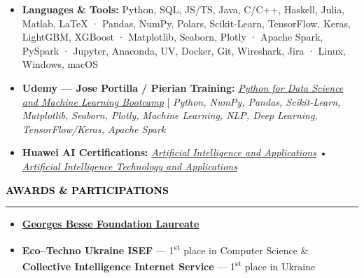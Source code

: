 \documentclass[10pt,english,french]{article}
\newcommand{\awardIcon}[1][black]{\textcolor{#1}{\faTrophy}}
\newcommand{\cvsection}[1]{
    \vspace{4pt}
    \textbf{\fontsize{9pt}{10pt}\selectfont \textcolor{black}{#1}}
    \vspace{6pt}
    \hrule
    \vspace{6pt}
}
\begin{document}
\vspace{-4pt}
\begin{itemize}[leftmargin=0.5cm, label=\textbullet, itemsep=0.2em]
    \item \textbf{Languages \& Tools\!:}
          Python, SQL, JS/TS, Java, C/C++, Haskell, Julia, Matlab, LaTeX ·
          Pandas, NumPy, Polars, Scikit-Learn, TensorFlow, Keras, LightGBM, XGBoost ·
          Matplotlib, Seaborn, Plotly ·
          Apache Spark, PySpark ·
          Jupyter, Anaconda, UV, Docker, Git, Wireshark, Jira ·
          Linux, Windows, macOS

    \item \textbf{Udemy --- Jose Portilla / Pierian Training\!:}
          \href{https://www.udemy.com/certificate/UC-51319000-ccb8-4c9c-9320-6cd9860e601c/}
          {\textit{Python for Data Science and Machine Learning Bootcamp}}
          |
          \textit{Python, NumPy, Pandas, Scikit-Learn, Matplotlib, Seaborn, Plotly,
              Machine Learning, NLP, Deep Learning, TensorFlow/Keras, Apache Spark}

    \item \textbf{Huawei AI Certifications:}
          \href{https://github.com/DmytroPalahin/cv-latex-simple-en/blob/main/docs/huawei_artificial_intelligence_and_applications.pdf}
          {\textit{Artificial Intelligence and Applications}}
          \hspace{4pt}•\hspace{4pt}
          \href{https://github.com/DmytroPalahin/cv-latex-simple-en/blob/main/docs/huawei_artificial_intelligence_technology_and_applications.pdf}
          {\textit{Artificial Intelligence Technology and Applications}}

\end{itemize}

\vspace{-3pt}
\cvsection{\awardIcon[black]\hspace{4pt}AWARDS \& PARTICIPATIONS}

\vspace{-6pt}
\begin{itemize}[leftmargin=0.35cm, label=\textbullet, itemsep=0.15em]
    \item \textbf{\href{https://www.fondationbesse.com/}{Georges Besse Foundation Laureate}}
    \item \textbf{Eco\hspace{3pt}--\hspace{3pt}Techno Ukraine ISEF} --- 1\textsuperscript{st} place in Computer Science \& \textbf{Collective Intelligence Internet Service} --- 1\textsuperscript{st} place in Ukraine
\end{itemize}
\end{document}
